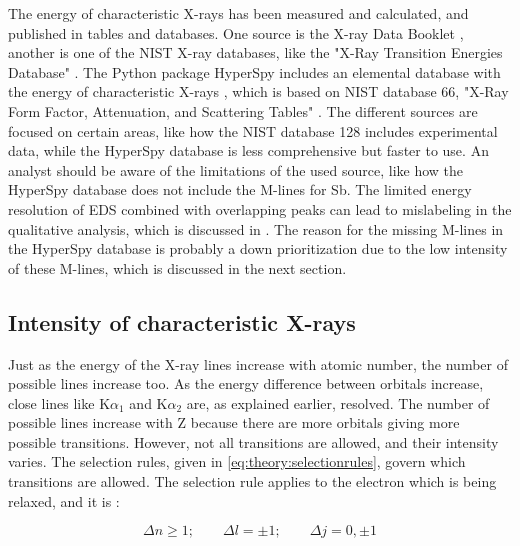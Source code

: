 The energy of characteristic X-rays has been measured and calculated, and published in tables and databases.
One source is the X-ray Data Booklet \cite{thompson_x-ray_2004}, another is one of the NIST X-ray databases, like the "X-Ray Transition Energies Database" \cite{nist_xraydatabase}.
The Python package HyperSpy includes an elemental database with the energy of characteristic X-rays \cite{hyperspy_1.7.1}, which is based on NIST database 66, "X-Ray Form Factor, Attenuation, and Scattering Tables" \cite{nist_xraydatabase_hyperspy}.
The different sources are focused on certain areas, like how the NIST database 128 includes experimental data, while the HyperSpy database is less comprehensive but faster to use.
An analyst should be aware of the limitations of the used source, like how the HyperSpy database does not include the M-lines for Sb.
The limited energy resolution of EDS combined with overlapping peaks can lead to mislabeling in the qualitative analysis, which is discussed in .
The reason for the missing M-lines in the HyperSpy database is probably a down prioritization due to the low intensity of these M-lines, which is discussed in the next section.



\subsection{Intensity of characteristic X-rays}
\label{theory:xray_formation:intensity}


Just as the energy of the X-ray lines increase with atomic number, the number of possible lines increase too.
As the energy difference between orbitals increase, close lines like K$\alpha_1$ and K$\alpha_2$ are, as explained earlier, resolved.
The number of possible lines increase with Z because there are more orbitals giving more possible transitions.
However, not all transitions are allowed, and their intensity varies.
The selection rules, given in \cref{eq:theory:selectionrules}, govern which transitions are allowed.
The selection rule applies to the electron which is being relaxed, and it is \cite[Sec. 8.2.2.2]{hollas_modern_2004}:

\begin{equation}
    \label{eq:theory:selectionrules}
    \Delta n \ge 1;\qquad \Delta l  = \pm 1;\qquad \Delta j = 0, \pm 1
\end{equation}

